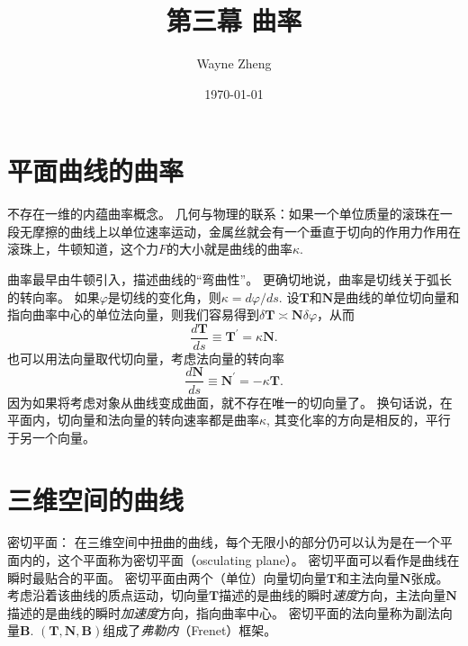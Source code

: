 \documentclass{article}
\title{第三幕 曲率}
\author{Wayne Zheng}
\date{\today}
\begin{document}
\maketitle
\tableofcontents

\section{平面曲线的曲率}

不存在一维的内蕴曲率概念。
几何与物理的联系：如果一个单位质量的滚珠在一段无摩擦的曲线上以单位速率运动，金属丝就会有一个垂直于切向的作用力作用在滚珠上，牛顿知道，这个力$F$的大小就是曲线的曲率$\kappa$.

曲率最早由牛顿引入，描述曲线的“弯曲性”。
更确切地说，曲率是切线关于弧长的转向率。
如果$\varphi$是切线的变化角，则$\kappa=d\varphi/ds$.
设$\mathbf{T}$和$\mathbf{N}$是曲线的单位切向量和指向曲率中心的单位法向量，则我们容易得到$\delta\mathbf{T}\asymp\mathbf{N}\delta\varphi$，从而
\begin{equation}
    \frac{d\mathbf{T}}{ds}\equiv\mathbf{T}^{\prime}
    =\kappa\mathbf{N}.
\end{equation}
也可以用法向量取代切向量，考虑法向量的转向率
\begin{equation}
    \frac{d\mathbf{N}}{ds}\equiv\mathbf{N}^{\prime}
    =-\kappa\mathbf{T}.
\end{equation}
因为如果将考虑对象从曲线变成曲面，就不存在唯一的切向量了。
换句话说，在平面内，切向量和法向量的转向速率都是曲率$\kappa$, 其变化率的方向是相反的，平行于另一个向量。

\section{三维空间的曲线}

密切平面：
在三维空间中扭曲的曲线，每个无限小的部分仍可以认为是在一个平面内的，这个平面称为密切平面（osculating plane）。
密切平面可以看作是曲线在瞬时最贴合的平面。
密切平面由两个（单位）向量切向量$\mathbf{T}$和主法向量$\mathbf{N}$张成。
考虑沿着该曲线的质点运动，切向量$\mathbf{T}$描述的是曲线的瞬时\emph{速度}方向，主法向量$\mathbf{N}$描述的是曲线的瞬时\emph{加速度}方向，指向曲率中心。
密切平面的法向量称为副法向量$\mathbf{B}$.
$(\mathbf{T}, \mathbf{N}, \mathbf{B})$组成了\emph{弗勒内}（Frenet）框架。
\end{document}
